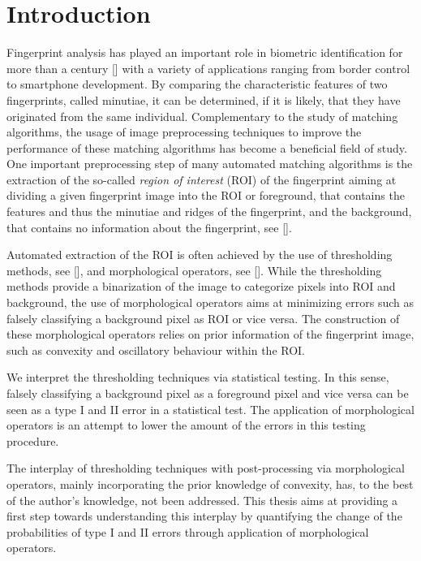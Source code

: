 \documentclass[a4paper,12pt]{article}
\theoremstyle{plain}
\theoremstyle{definition}
\begin{document}
\newpage

\section{Introduction}\label{sectionintroduction}

Fingerprint analysis has played an important role in biometric identification for more than a century [] with a variety of applications ranging from border control to smartphone development. By comparing the characteristic features of two fingerprints, called minutiae, it can be determined, if it is likely, that they have originated from the same individual. Complementary to the study of matching algorithms, the usage of image preprocessing techniques to improve the performance of these matching algorithms has become a beneficial field of study. One important preprocessing step of many automated matching algorithms is the extraction of the so-called \emph{region of interest} (ROI) of the fingerprint aiming at dividing a given fingerprint image into the ROI or foreground, that contains the features and thus the minutiae and ridges of the fingerprint, and the background, that contains no information about the fingerprint, see [].

Automated extraction of the ROI is often achieved by the use of thresholding methods, see [], and morphological operators, see []. While the thresholding methods provide a binarization of the image to categorize pixels into ROI and background, the use of morphological operators aims at minimizing errors such as falsely classifying a background pixel as ROI or vice versa. The construction of these morphological operators relies on prior information of the fingerprint image, such as convexity and oscillatory behaviour within the ROI.

We interpret the thresholding techniques via statistical testing. In this sense, falsely classifying a background pixel as a foreground pixel and vice versa can be seen as a type I and II error in a statistical test. The application of morphological operators is an attempt to lower the amount of the errors in this testing procedure.

The interplay of thresholding techniques with post-processing via morphological operators, mainly incorporating the prior knowledge of convexity, has, to the best of the author's knowledge, not been addressed. This thesis aims at providing a first step towards understanding this interplay by quantifying the change of the probabilities of type I and II errors through application of morphological operators.
\end{document}
